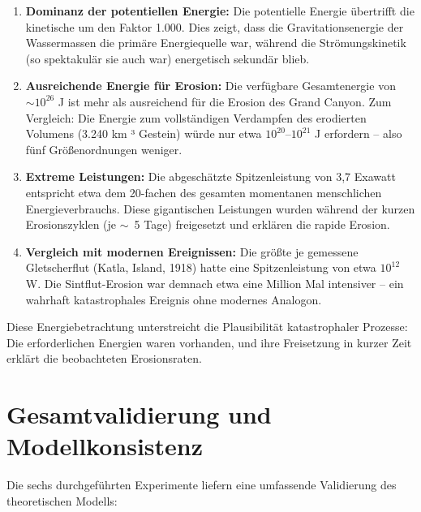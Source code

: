 ﻿\documentclass[12pt,a4paper]{report}
\begin{document}
\begin{enumerate}
	\item \textbf{Dominanz der potentiellen Energie:} Die potentielle Energie übertrifft die kinetische um den Faktor 1.000. Dies zeigt, dass die Gravitationsenergie der Wassermassen die primäre Energiequelle war, während die Strömungskinetik (so spektakulär sie auch war) energetisch sekundär blieb.
	
	\item \textbf{Ausreichende Energie für Erosion:} Die verfügbare Gesamtenergie von $\sim 10^{26}$ J ist mehr als ausreichend für die Erosion des Grand Canyon. Zum Vergleich: Die Energie zum vollständigen Verdampfen des erodierten Volumens (3.240 km ³ Gestein) würde \glqq nur\grqq{} etwa $10^{20}$--$10^{21}$ J erfordern -- also fünf Größenordnungen weniger.
	
	\item \textbf{Extreme Leistungen:} Die abgeschätzte Spitzenleistung von 3,7 Exawatt entspricht etwa dem 20-fachen des gesamten momentanen menschlichen Energieverbrauchs. Diese gigantischen Leistungen wurden während der kurzen Erosionszyklen (je $\sim$~5 Tage) freigesetzt und erklären die rapide Erosion.
	
	\item \textbf{Vergleich mit modernen Ereignissen:} Die größte je gemessene Gletscherflut (Katla, Island, 1918) hatte eine Spitzenleistung von etwa $10^{12}$ W. Die Sintflut-Erosion war demnach etwa eine Million Mal intensiver -- ein wahrhaft katastrophales Ereignis ohne modernes Analogon.
\end{enumerate}

Diese Energiebetrachtung unterstreicht die Plausibilität katastrophaler Prozesse: Die erforderlichen Energien waren vorhanden, und ihre Freisetzung in kurzer Zeit erklärt die beobachteten Erosionsraten.

\section{Gesamtvalidierung und Modellkonsistenz}

Die sechs durchgeführten Experimente liefern eine umfassende Validierung des theoretischen Modells:
\end{document}
